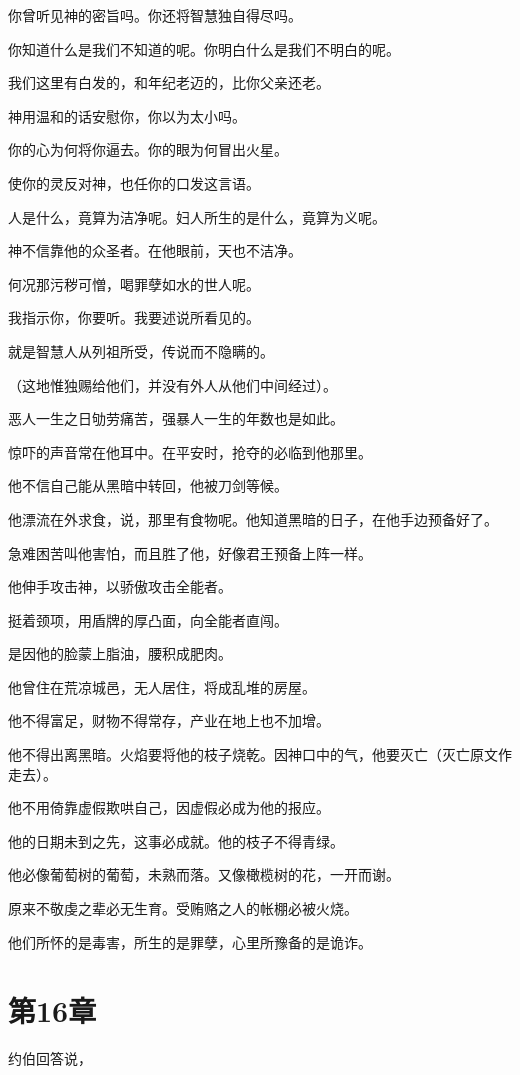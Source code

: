 \documentclass[12pt,oneside]{book}
\begin{document}
你曾听见神的密旨吗。你还将智慧独自得尽吗。

你知道什么是我们不知道的呢。你明白什么是我们不明白的呢。

我们这里有白发的，和年纪老迈的，比你父亲还老。

神用温和的话安慰你，你以为太小吗。

你的心为何将你逼去。你的眼为何冒出火星。

使你的灵反对神，也任你的口发这言语。

人是什么，竟算为洁净呢。妇人所生的是什么，竟算为义呢。

神不信靠他的众圣者。在他眼前，天也不洁净。

何况那污秽可憎，喝罪孽如水的世人呢。

我指示你，你要听。我要述说所看见的。

就是智慧人从列祖所受，传说而不隐瞒的。

（这地惟独赐给他们，并没有外人从他们中间经过）。

恶人一生之日劬劳痛苦，强暴人一生的年数也是如此。

惊吓的声音常在他耳中。在平安时，抢夺的必临到他那里。

他不信自己能从黑暗中转回，他被刀剑等候。

他漂流在外求食，说，那里有食物呢。他知道黑暗的日子，在他手边预备好了。

急难困苦叫他害怕，而且胜了他，好像君王预备上阵一样。

他伸手攻击神，以骄傲攻击全能者。

挺着颈项，用盾牌的厚凸面，向全能者直闯。

是因他的脸蒙上脂油，腰积成肥肉。

他曾住在荒凉城邑，无人居住，将成乱堆的房屋。

他不得富足，财物不得常存，产业在地上也不加增。

他不得出离黑暗。火焰要将他的枝子烧乾。因神口中的气，他要灭亡（灭亡原文作走去）。

他不用倚靠虚假欺哄自己，因虚假必成为他的报应。

他的日期未到之先，这事必成就。他的枝子不得青绿。

他必像葡萄树的葡萄，未熟而落。又像橄榄树的花，一开而谢。

原来不敬虔之辈必无生育。受贿赂之人的帐棚必被火烧。

他们所怀的是毒害，所生的是罪孽，心里所豫备的是诡诈。



\chapter{第16章}
约伯回答说，
\end{document}

